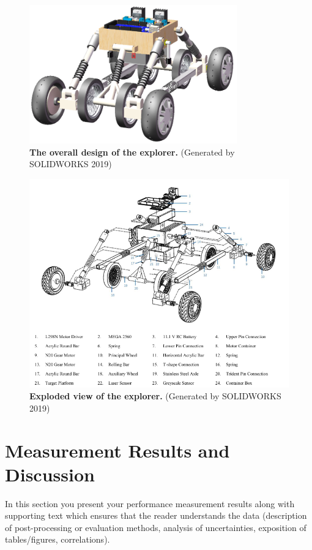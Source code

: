 \documentclass{engr1000j-s2}
\begin{document}
  \begin{figure}[H]
    \centering
    \includegraphics[width=0.8\textwidth]{figures/overall_design.png}
    \caption{\quad \textbf{The overall design of the explorer.} (Generated by
    SOLIDWORKS 2019)}
    \label{fig:overall_design}
  \end{figure}

  \begin{figure}[H]
    \centering
    \includegraphics[width=\textwidth]{figures/explosive_view.png}
    \caption{\quad \textbf{Exploded view of the explorer.} (Generated by SOLIDWORKS
    2019)}
    \label{fig:explosive_view}
  \end{figure}

  

  \section{Measurement Results and Discussion}
  In this section you present your performance measurement results along with supporting
  text which ensures that the reader understands the data (description of post-processing
  or evaluation methods, analysis of uncertainties, exposition of tables/figures,
  correlations).
\end{document}
